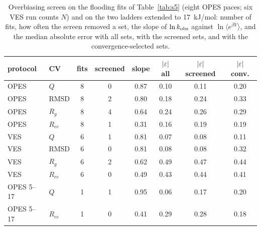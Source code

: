 \begin{table}[H]\centering
\caption{Overbiasing screen on the flooding fits of Table~\ref{tab:s5} (eight OPES paces; six VES run counts $N$) and on the two ladders extended to 17~kJ/mol: number of fits, how often the screen removed a set, the slope of $\ln k_{\rm obs}$ against $\ln\langle e^{\beta V}\rangle$, and the median absolute error with all sets, with the screened sets, and with the convergence-selected sets.}\label{tab:s6}
\begin{tabular}{llcccccc}\toprule
protocol & CV & fits & screened & slope & $|\varepsilon|$ all & $|\varepsilon|$ screened & $|\varepsilon|$ conv.\\ \midrule
OPES & $Q$ & 8 & 0 & 0.87 & 0.10 & 0.11 & 0.20 \\
OPES & RMSD & 8 & 2 & 0.80 & 0.18 & 0.24 & 0.33 \\
OPES & $R_g$ & 8 & 4 & 0.64 & 0.24 & 0.26 & 0.29 \\
OPES & $R_{ee}$ & 8 & 1 & 0.31 & 0.16 & 0.19 & 0.19 \\
VES & $Q$ & 6 & 1 & 0.81 & 0.07 & 0.08 & 0.11 \\
VES & RMSD & 6 & 0 & 0.81 & 0.08 & 0.08 & 0.32 \\
VES & $R_g$ & 6 & 2 & 0.62 & 0.49 & 0.47 & 0.44 \\
VES & $R_{ee}$ & 6 & 0 & 0.49 & 0.43 & 0.44 & 0.41 \\
OPES 5--17 & $Q$ & 1 & 1 & 0.95 & 0.06 & 0.17 & 0.20 \\
OPES 5--17 & $R_{ee}$ & 1 & 0 & 0.41 & 0.29 & 0.28 & 0.18\\ \bottomrule
\end{tabular}
\end{table}
